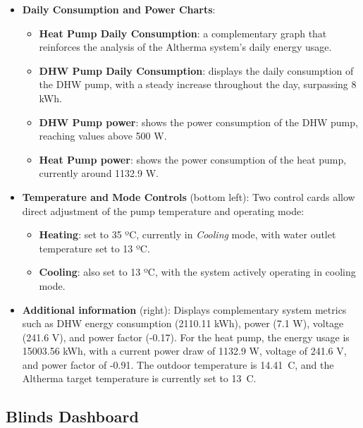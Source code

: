 \documentclass[graybox]{svmult}
\begin{document}
\begin{itemize}
    \item \textbf{Daily Consumption and Power Charts}:
    \begin{itemize}
        \item \textbf{Heat Pump Daily Consumption}: a complementary graph that reinforces the analysis of the Altherma system’s daily energy usage.
        \item \textbf{DHW Pump Daily Consumption}: displays the daily consumption of the DHW pump, with a steady increase throughout the day, surpassing 8 kWh.
        \item \textbf{DHW Pump power}: shows the power consumption of the DHW pump, reaching values above 500 W.
        \item \textbf{Heat Pump power}: shows the power consumption of the heat pump, currently around 1132.9 W.
    \end{itemize}

    \item \textbf{Temperature and Mode Controls} (bottom left): Two control cards allow direct adjustment of the pump temperature and operating mode:
    \begin{itemize}
        \item \textbf{Heating}: set to 35 ºC, currently in \textit{Cooling} mode, with water outlet temperature set to 13 ºC.
        \item \textbf{Cooling}: also set to 13 ºC, with the system actively operating in cooling mode.
    \end{itemize}

    \item \textbf{Additional information} (right): Displays complementary system metrics such as DHW energy consumption (2110.11 kWh), power (7.1 W), voltage (241.6 V), and power factor (-0.17). For the heat pump, the energy usage is 15003.56 kWh, with a current power draw of 1132.9 W, voltage of 241.6 V, and power factor of -0.91. The outdoor temperature is 14.41~\textdegree{}C, and the Altherma target temperature is currently set to 13~\textdegree{}C.


\end{itemize}

\subsection{Blinds Dashboard}
\end{document}
